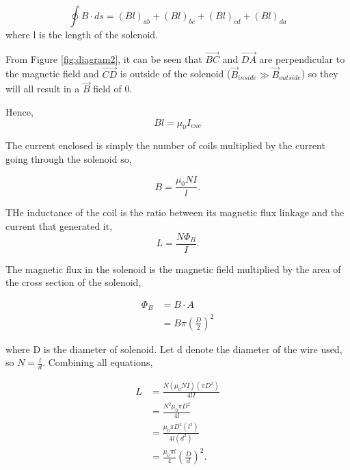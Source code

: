 \documentclass{article}
\begin{document}
\begin{equation}
    \oint{B\cdot ds} = (Bl)_{ab} + (Bl)_{bc} + (Bl)_{cd} + 
    (Bl)_{da}
\end{equation}
where l is the length of the solenoid.

From Figure \ref*{fig:diagram2}, it can be seen that 
$\vec{BC}$ and $\vec{DA}$ are perpendicular to the magnetic
field and $\vec{CD}$ is outside of the solenoid 
($\vec{B}_{inside} \gg \vec{B}_{outside}$) so they will
all result in a $\vec{B}$ field of 0.

Hence,
\begin{equation}
    Bl = \mu_0 I_{enc}
\end{equation}

The current enclosed is simply the number of coils multiplied
by the current going through the solenoid so,

\begin{equation}
    B = \frac{\mu_0 N I}{l}.
\end{equation}

THe inductance of the coil is the ratio between its magnetic
flux linkage and the current that generated it,
\begin{equation}
    L = \frac{N\Phi_{B}}{I}.
\end{equation}

The magnetic flux in the solenoid is the magnetic field 
multiplied by the area of the cross section of the solenoid,

\begin{equation}
    \begin{split}
        \Phi_B &= B \cdot A \\
        &= B \pi \left(\frac{D}{2}\right)^2
    \end{split}
\end{equation}

where D is the diameter of solenoid. Let d denote the diameter 
of the wire used, so $N = \frac{l}{d}$. Combining all equations,

\begin{equation}
    \begin{split}
        L &= \frac{N(\mu_0NI)(\pi D^2)}{4lI} \\
        &= \frac{N^2\mu_0\pi D^2}{4l} \\
        &= \frac{\mu_0 \pi D^2 (l^2)}{4l (d^2)} \\
        &= \frac{\mu_0 \pi l}{4} \left(\frac{D}{d}\right)^2.
    \end{split}
\end{equation}
\end{document}
